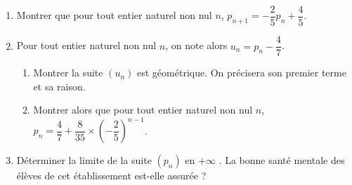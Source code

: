 \documentclass[11pt,fleqn, openany]{book} %
\begin{document}
\begin{exercise}
\begin{enumerate}
\begin{center}
\end{center}

    \item Montrer que pour tout entier naturel non nul $n$, $p_{n+1}=-\dfrac{2}{5}p_n+\dfrac{4}{5}$.
    \item Pour tout entier naturel non nul $n$, on note alors $u_n=p_n-\dfrac{4}{7}$.
    \begin{enumerate}
        \item Montrer la suite $(u_n)$ est géométrique. On précisera son premier terme et sa raison.
        \item Montrer alors que pour tout entier naturel non nul $n$, $p_n=\dfrac{4}{7}+\dfrac{8}{35} \times \left(-\dfrac{2}{5}\right)^{n-1}$.
    \end{enumerate}
    \item Déterminer la limite de la suite $(p_n)$ en $+\infty$ . La bonne santé mentale des élèves de cet établissement est-elle assurée ?
\end{enumerate}
\end{exercise}
\end{document}
